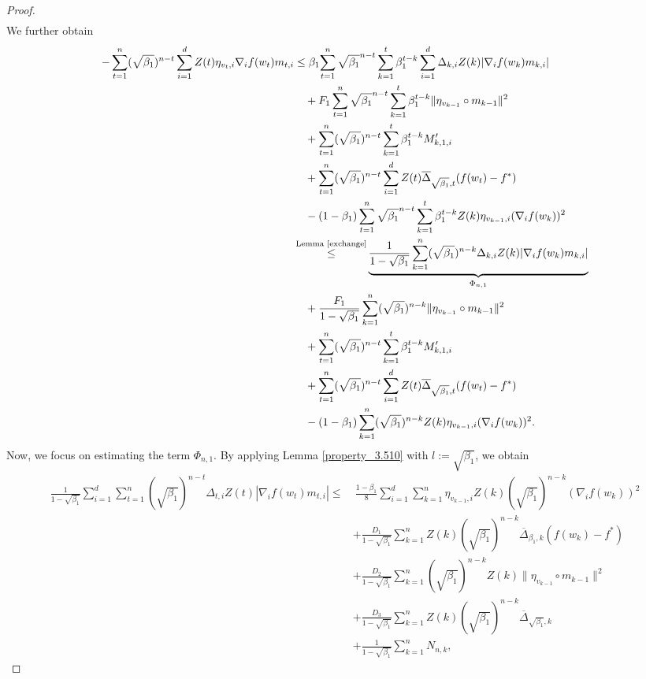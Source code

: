 \documentclass{article} %
\begin{document}
\begin{proof}
\begin{align*}
\end{align*}
We further obtain
\begin{align}\label{0adam_0}
-\sum_{t=1}^{n}(\sqrt{\beta_{1}})^{n-t}\sum_{i=1}^{d}Z(t)\eta_{v_{t},i}\nabla_{i}f(w_{t})m_{t,i}&\le \beta_{1}{\sum_{t=1}^{n}\sqrt{\beta_{1}}^{n-t}\sum_{k=1}^{t}\beta_{1}^{t-k}  \sum_{i=1}^{d}\Delta_{k,i}Z(k)|\nabla_{i}f(w_{k})m_{k,i}|}\notag\\&\quad+F_{1}\sum_{t=1}^{n}\sqrt{\beta_{1}}^{n-t}\sum_{k=1}^{t}\beta_{1}^{t-k}\|\eta_{v_{k-1}}\circ m_{k-1}\|^{2}\notag\\&\quad+\sum_{t=1}^{n}(\sqrt{\beta_{1}})^{n-t}\sum_{k=1}^{t}\beta_{1}^{t-k}M_{k,1,i}'\notag\\&\quad+\sum_{t=1}^{n}(\sqrt{\beta_{1}})^{n-t}\sum_{i=1}^{d}Z(t)\overline{\Delta}_{\sqrt{\beta_{1}},t}(f(w_{t})-f^*)\notag\\&\quad-(1-\beta_{1})\sum_{t=1}^{n}\sqrt{\beta_{1}}^{n-t}\sum_{k=1}^{t}\beta_{1}^{t-k}Z(k)\eta_{v_{k-1},i}(\nabla_{i}f(w_{k}))^{2}\notag\\&\mathop{\le}^{\text{Lemma \ref{exchange}}}\underbrace{\frac{1}{1-\sqrt{\beta_{1}}}\sum_{k=1}^{n}(\sqrt{\beta_{1}})^{n-k}\Delta_{k,i}Z(k)|\nabla_{i}f(w_{k})m_{k,i}|}_{\Phi_{n,1}}\notag\\&\quad+\frac{F_{1}}{1-\sqrt{\beta_{1}}}\sum_{k=1}^{n}(\sqrt{\beta_{1}})^{n-k}\|\eta_{v_{k-1}}\circ m_{k-1}\|^{2}\notag\\&\quad+\sum_{t=1}^{n}(\sqrt{\beta_{1}})^{n-t}\sum_{k=1}^{t}\beta_{1}^{t-k}M_{k,1,i}'\notag\\&\quad+\sum_{t=1}^{n}(\sqrt{\beta_{1}})^{n-t}\sum_{i=1}^{d}Z(t)\overline{\Delta}_{\sqrt{\beta_{1}},t}(f(w_{t})-f^*)\notag\\&\quad-(1-\beta_{1})\sum_{k=1}^{n}(\sqrt{\beta_{1}})^{n-k}Z(k)\eta_{v_{k-1},i}(\nabla_{i}f(w_{k}))^{2}.
\end{align}
Now, we focus on estimating the term \(\Phi_{n,1}.\) By applying Lemma \ref{property_3.510} with \(l := \sqrt{\beta_{1}}\), we obtain
\begin{align*}
\frac{1}{1-\sqrt{\beta_{1}}}\sum_{i=1}^{d}\sum_{t=1}^{n}(\sqrt{\beta_{1}})^{n-t}\Delta_{t,i}Z(t)|\nabla_{i} f(w_{t})m_{t,i}|\le &\ \frac{1-\beta_{1}}{8}\sum_{i=1}^{d}\sum_{k=1}^{n}\eta_{v_{k-1},i}Z(k)(\sqrt{\beta_{1}})^{n-k}(\nabla_{i}f(w_{k}))^{2}\\&+\frac{D_{1}}{1-\sqrt{\beta_{1}}}\sum_{k=1}^{n}Z(k)(\sqrt{\beta_{1}})^{n-k}\overline{\Delta}_{\beta_{1},k}(f(w_{k})-f^*)\\&+\frac{D_{2}}{1-\sqrt{\beta_{1}}}\sum_{k=1}^{n}(\sqrt{\beta_{1}})^{n-k}Z(k)\|\eta_{v_{k-1}}\circ m_{k-1}\|^{2}\\&+\frac{D_{3}}{1-\sqrt{\beta_{1}}}\sum_{k=1}^{n}Z(k)(\sqrt{\beta_{1}})^{n-k}\overline{\Delta}_{\sqrt{\beta_{1}},k}\\&+\frac{{1}}{1-\sqrt{\beta_{1}}}\sum_{k=1}^{n}N_{n,k},

\end{align*}
\end{proof}
\end{document}
